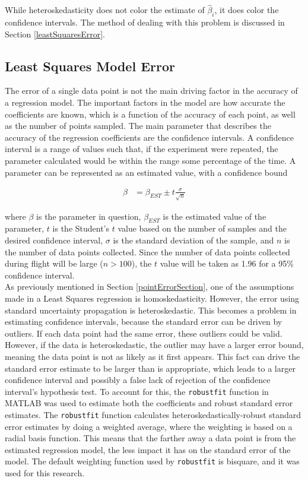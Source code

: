 While heteroskedasticity does not color the estimate of $\hat{\beta}_i$, it does color the confidence intervals. The method of dealing with this problem is discussed in Section \ref{leastSquaresError}.


\subsection*{Least Squares Model Error}
\label{leastSquaresError}
The error of a single data point is not the main driving factor in the accuracy of a regression model. The important factors in the model are how accurate the coefficients are known, which is a function of the accuracy of each point, as well as the number of points sampled. The main parameter that describes the accuracy of the regression coefficients are the confidence intervals. A confidence interval is a range of values such that, if the experiment were repeated, the parameter calculated would be within the range some percentage of the time. A parameter can be represented as an estimated value, with a confidence bound

\begin{align}
\label{confidenceInterval}
\beta &= \beta_{EST} \pm t\frac{\sigma}{\sqrt{n}}
\end{align}

where $\beta$ is the parameter in question, $\beta_{EST}$ is the estimated value of the parameter, $t$ is the Student's $t$ value based on the number of samples and the desired confidence interval, $\sigma$ is the standard deviation of the sample, and $n$ is the number of data points collected. Since the number of data points collected during flight will be large ($n>100$), the $t$ value will be taken as 1.96 for a 95\% confidence interval.\\
As previously mentioned in Section \ref{pointErrorSection}, one of the assumptions made in a Least Squares regression is homoskedasticity. However, the error using standard uncertainty propagation is heteroskedastic. This becomes a problem in estimating confidence intervals, because the standard error can be driven by outliers. If each data point had the same error, these outliers could be valid. However, if the data is heteroskedastic, the outlier may have a larger error bound, meaning the data point is not as likely as it first appears. This fact can drive the standard error estimate to be larger than is appropriate, which leads to a larger confidence interval and possibly a false lack of rejection of the confidence interval's hypothesis test. To account for this, the \texttt{robustfit} function in MATLAB  was used to estimate both the coefficients and robust standard error estimates. The \texttt{robustfit} function calculates heteroskedastically-robust standard error estimates by doing a weighted average, where the weighting is based on a radial basis function. This means that the farther away a data point is from the estimated regression model, the less impact it has on the standard error of the model. The default weighting function used by \texttt{robustfit} is bisquare, and it was used for this research.

